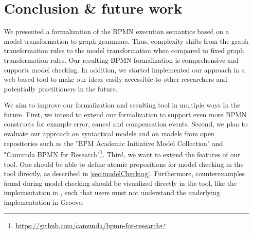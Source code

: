 \documentclass[submission, copyright, creativecommons]{eptcs}
\begin{document}
\section{Conclusion \& future work} \label{sec:conclusion}
We presented a formalization of the BPMN execution semantics based on a model transformation to graph grammars.
Thus, complexity shifts from the graph transformation rules to the model transformation when compared to fixed graph transformation rules.
Our resulting BPMN formalization is comprehensive and supports model checking.
In addition, we started implemented our approach in a web-based tool to make our ideas easily accessible to other researchers and potentially practitioners in the future.

We aim to improve our formalization and resulting tool in multiple ways in the future.
First, we intend to extend our formalization to support even more BPMN constructs for example error, cancel and compensation events.
Second, we plan to evaluate our approach on syntactical models and on models from open repositories such as the "BPM Academic Initiative Model Collection" \cite{weskeModelCollectionBusiness2020} and "Camunda BPMN for
Research"\footnote{\url{https://github.com/camunda/bpmn-for-research}}.
Third, we want to extend the features of our tool.
One should be able to define atomic propositions for model checking in the tool directly, as described in \cref{sec:modelChecking}.
Furthermore, counterexamples found during model checking should be visualized directly in the tool, like the implementation in \cite{houhouFirstOrderLogicVerification2022}, such that users must not understand the underlying implementation in Groove.


\end{document}
